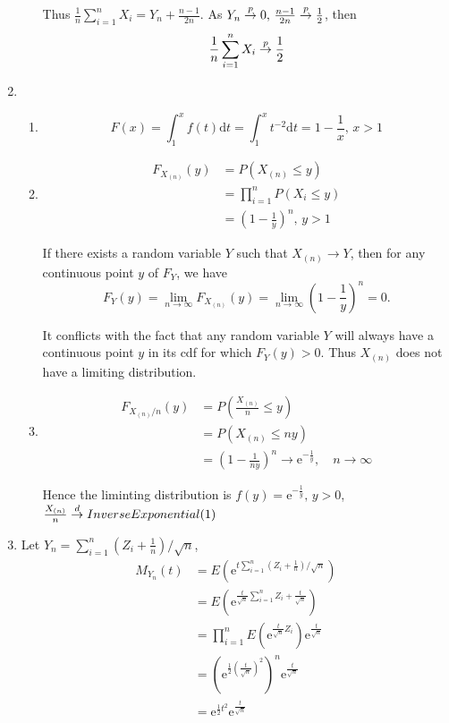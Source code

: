 \documentclass{article}
\begin{document}
\begin{enumerate}[leftmargin = 0 em, label = \arabic*., font = \bfseries]
\begin{enumerate}
	Thus $\frac{1}{n}\sum_{i=1}^n X_i = Y_n + \frac{n-1}{2n}$. As $Y_n \overset{p}{\to} 0,\, \frac{n-1}{2n}\overset{p}{\to} \frac{1}{2}$, then
	\[\frac{1}{n} \sum_{i=1}^n X_i \overset{p}{\to} \frac{1}{2}\]
	
	\end{enumerate}

	\item 
	\begin{enumerate}
		\item 
		\[F(x) = \int_{1}^{x} f(t)\mathrm{d}t = \int_{1}^x t^{-2}\mathrm{d}t = 1 - \frac{1}{x},\, x > 1\]

		\item
		\begin{align*}
		F_{X_{(n)}}(y) & = P(X_{(n)} \leq y)\\
		& = \prod_{i=1}^n P(X_i \leq y)\\
		& = (1 - \frac{1}{y})^n,\, y >1
		\end{align*}

		If there exists a random variable $Y$ such that $X_{(n)}\to Y$, then for any continuous point $y$ of $F_{Y}$, we have
		\[F_Y (y) = \lim_{n\to\infty} F_{X_{(n)}} (y) = \lim_{n\to\infty} (1 - \frac{1}{y})^n = 0. \]

		It conflicts with the fact that any random variable $Y$ will always have a continuous point $y$ in its cdf for which $F_Y (y) > 0$. Thus $X_{(n)}$ does not have a limiting distribution.



		\item 
		\begin{align*}
		F_{X_{(n)}/n} (y) & = P(\frac{X_{(n)}}{n} \leq y)\\
		& = P(X_{(n)} \leq ny)\\
		& = (1 - \frac{1}{ny})^n\to \mathrm{e}^{-\frac{1}{y}} ,\quad n\to \infty 
		\end{align*}
		
		Hence the liminting distribution is $f(y) = \mathrm{e}^{- \frac{1}{y}},\, y > 0$, $\frac{X_{(n)}}{n} \overset{d}{\to} InverseExponential(1)$
		
	\end{enumerate}

	\item 
	Let $Y_n = \sum_{i=1}^n (Z_i + \frac{1}{n})/{\sqrt{n}}$,
	\begin{align*}
	M_{Y_n} (t) & = E(\mathrm{e}^{t \sum_{i=1}^n (Z_i + \frac{1}{n})/{\sqrt{n}}})\\
	& = E(\mathrm{e}^{\frac{t}{\sqrt{n}} \sum_{i=1}^n Z_i + \frac{t}{\sqrt{n}}})\\
	& = \prod_{i=1}^n E(\mathrm{e}^{\frac{t}{\sqrt{n}}Z_i}) \mathrm{e}^{\frac{t}{\sqrt{n}}}\\
	& = (\mathrm{e}^{\frac{1}{2} (\frac{t}{\sqrt{n}})^2})^n \mathrm{e}^{\frac{t}{\sqrt{n}}}\\
	& = \mathrm{e}^{\frac{1}{2} t^2} \mathrm{e}^{\frac{t}{\sqrt{n}}}
	\end{align*}


\end{enumerate}
\end{document}
